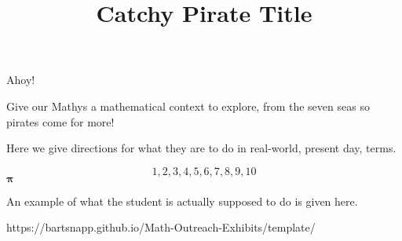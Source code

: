 \documentclass{../exhibit}
\title{Catchy Pirate Title}
\begin{document}
\begin{context}
  Ahoy!

  Give our Mathys a mathematical context to explore, from the seven
  seas  so pirates come for more!
\end{context}



\begin{directions}
  Here we give directions for what they are to do in real-world,
  present day, terms.

  \[
  1,2,3,4,5,6,7,8,9,10
  \]
  $\mathbf{\pi}$
\end{directions}



\begin{example}
  An example of what the student is actually supposed to do is given
  here.
\end{example}



\begin{mathConnections}
  https://bartsnapp.github.io/Math-Outreach-Exhibits/template/
\end{mathConnections}
\end{document}
